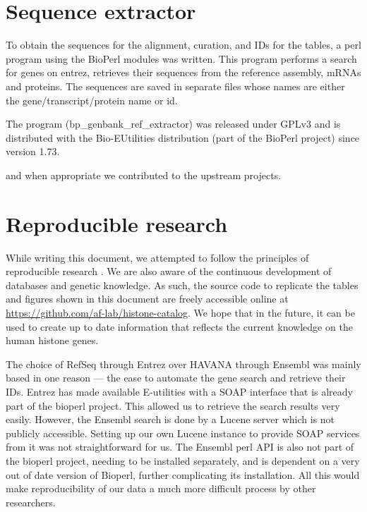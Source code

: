 \documentclass[10pt,a4paper,onecolumn,article]{memoir}
\begin{document}
  \section{Sequence extractor}
    To obtain the sequences for the alignment, curation, and IDs for the tables, a perl program using the
    BioPerl modules was written. This program performs a search for genes on entrez, retrieves
    their sequences from the reference assembly, mRNAs and proteins. The sequences are saved in separate files whose
    names are either the gene/transcript/protein name or id.

    The program (bp\_genbank\_ref\_extractor) was released under GPLv3 and is distributed with
    the Bio-EUtilities distribution (part of the BioPerl project) since version 1.73.


    and when appropriate we contributed to the upstream projects.




  \section{Reproducible research}
  \label{sec:reproducible}
    While writing this document, we attempted to follow the principles of reproducible research
    \citep{reproducible-research-bioinformatics, reproducible-research-law}.
    We are also aware of the continuous development of databases and genetic knowledge. As such,
    the source code to replicate the tables and figures shown in this document are freely accessible
    online at \url{https://github.com/af-lab/histone-catalog}. We hope that in the future, it can
    be used to create up to date information
    that reflects the current knowledge on the human histone genes.

    The choice of RefSeq through Entrez over HAVANA through Ensembl was mainly based in one reason --- the ease
    to automate the gene search and retrieve their IDs. Entrez has made available E-utilities with a SOAP interface
    that is already part of the bioperl project. This allowed us to retrieve the search results very easily.
    However, the Ensembl search is done by a Lucene server which is not publicly accessible. Setting up our own
    Lucene instance to provide SOAP services from it was not straightforward for us. The Ensembl perl API is
    also not part of the bioperl project, needing to be installed separately, and is dependent on a very
    out of date version of Bioperl, further complicating its installation. All this would make reproducibility
    of our data a much more difficult process by other researchers.
\end{document}
